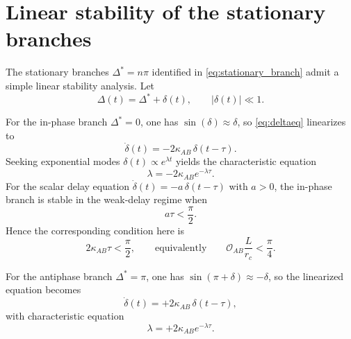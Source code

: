 \documentclass[11pt]{article}
\newcommand{\rc}{r_c}
\begin{document}
    \section{Linear stability of the stationary branches}

        The stationary branches \(\Delta^\ast=n\pi\) identified in \cref{eq:stationary_branch} admit a simple linear stability analysis. Let
        \begin{equation}
            \Delta(t)=\Delta^\ast+\delta(t),
            \qquad
            |\delta(t)|\ll 1.
        \end{equation}

        For the in-phase branch \(\Delta^\ast=0\), one has \(\sin(\delta)\approx \delta\), so \cref{eq:deltaeq} linearizes to
        \begin{equation}
            \dot{\delta}(t)=-2\kappa_{AB}\,\delta(t-\tau).
            \label{eq:lin_zero}
        \end{equation}
        Seeking exponential modes \(\delta(t)\propto e^{\lambda t}\) yields the characteristic equation
        \begin{equation}
            \lambda=-2\kappa_{AB}e^{-\lambda\tau}.
            \label{eq:char_zero}
        \end{equation}
        For the scalar delay equation \(\dot{\delta}(t)=-a\,\delta(t-\tau)\) with \(a>0\), the in-phase branch is stable in the weak-delay regime when
        \begin{equation}
            a\tau<\frac{\pi}{2}.
        \end{equation}
        Hence the corresponding condition here is
        \begin{equation}
            2\kappa_{AB}\tau<\frac{\pi}{2},
            \qquad\text{equivalently}\qquad
            \mathcal{O}_{AB}\frac{L}{\rc}<\frac{\pi}{4}.
            \label{eq:weak_delay_stability}
        \end{equation}

        For the antiphase branch \(\Delta^\ast=\pi\), one has \(\sin(\pi+\delta)\approx -\delta\), so the linearized equation becomes
        \begin{equation}
            \dot{\delta}(t)=+2\kappa_{AB}\,\delta(t-\tau),
            \label{eq:lin_pi}
        \end{equation}
        with characteristic equation
        \begin{equation}
            \lambda=+2\kappa_{AB}e^{-\lambda\tau}.
            \label{eq:char_pi}
        \end{equation}
\end{document}
